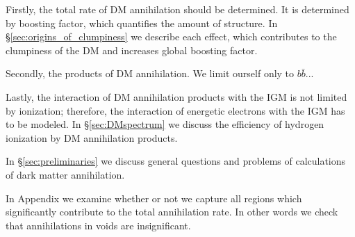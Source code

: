 Firstly, the total rate of DM annihilation should be determined. It is determined by boosting factor, which quantifies the amount of structure. In \S\ref{sec:origins_of_clumpiness} we describe each effect, which contributes to the clumpiness of the DM and increases global boosting factor.

Secondly, the products of DM annihilation. We limit ourself only to $b\bar{b}$...

Lastly, the interaction of DM annihilation products with the IGM is not limited by ionization; therefore, the interaction of energetic electrons with the IGM has to be modeled. In \S\ref{sec:DMspectrum} we discuss the efficiency of hydrogen ionization by DM annihilation products.

In \S\ref{sec:preliminaries} we discuss general questions and problems of calculations of dark matter annihilation.


In Appendix we examine whether or not we capture all regions which significantly contribute to the total annihilation rate. In other words we check that annihilations in voids are insignificant.
